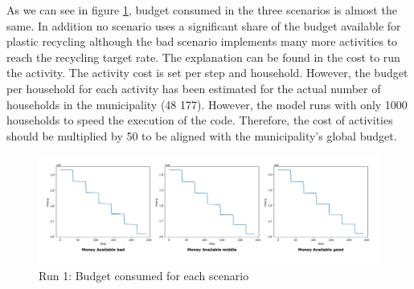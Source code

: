 \noindent As we can see in figure \ref{fig:Run 1 budget}, budget consumed in the three scenarios is almost the same. In addition no scenario uses a significant share of the budget available for plastic recycling although the bad scenario implements many more activities to reach the recycling target rate. The explanation can be found in the cost to run the activity. The activity cost is set per step and household. However, the budget per household for each activity has been estimated for the actual number of households in the municipality (48 177). However, the model runs with only 1000 households to speed the execution of the code. Therefore, the cost of activities should be multiplied by 50 to be aligned with the municipality's global budget.

\begin{figure}[H]
    \centering
        \captionsetup{width=\linewidth}
        \includegraphics[width=1.0\linewidth]{Images/Run 1 budget.png}
        \caption{Run 1: Budget consumed for each scenario}
    \label{fig:Run 1 budget}
\end{figure}\\

